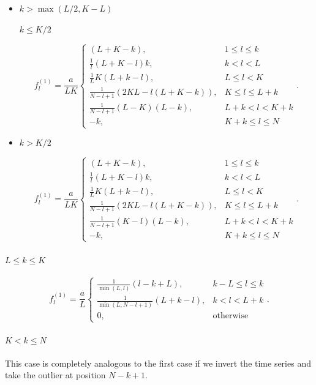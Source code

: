 \documentclass[engproc, submit, article,pdftex,moreauthors]{Definitions/mdpi}
\begin{document}
\begin{itemize}
\item
$k > \max(L / 2, K - L)$

$k \leq K/2$

$$f^{(1)}_l = \frac{a}{{LK}}
\begin{cases}
	(L + K - k), & \text{$1 \leq l \leq k$}\\
	\frac{1}{l}(L + K - l)k, & \text{$k < l < L$}\\
	\frac{1}{L}K(L + k - l), &\text{$L \leq l < K$}\\
	\frac{1}{N - l + 1}(2KL - l(L + K - k)), &\text{$K \leq l \leq L + k$}\\
	\frac{1}{N - l + 1}(L - K)(L - k), &\text{$L + k < l < K + k$}\\
	-k, &\text{$K + k \leq l \leq N$}
\end{cases}.
$$

\item
$k > K/2$


$$f^{(1)}_l = \frac{a}{{LK}}
\begin{cases}
	(L + K - k), & \text{$1 \leq l \leq k$}\\
	\frac{1}{l}(L + K - l)k, & \text{$k < l < L$}\\
	\frac{1}{L}K(L + k - l), &\text{$L \leq l < K$}\\
	\frac{1}{N - l + 1}(2KL - l(L + K - k)), &\text{$K \leq l \leq L + k$}\\
	\frac{1}{N - l + 1}(K - l)(L - k), &\text{$L + k < l < K + k$}\\
	-k, &\text{$K + k \leq l \leq N $}
\end{cases}.
$$
\end{itemize}

\paragraph{$L \leq k \leq K$}

$$f^{(1)}_l = \frac{a}{{L}}
\begin{cases}
	\frac{1}{\min(L, l)}(l - k + L), & \text{$k - L \leq l \leq k$}\\
	\frac{1}{\min(L, N - l + 1)}(L + k - l), & \text{$k < l < L + k$}\\
	0, & \text{otherwise}
\end{cases}.$$


\paragraph{$K < k \leq N$}
\label{sub:const_noise}
This case is completely analogous to the first case if we invert the time series and take the outlier at position $N - k + 1$.
\end{document}
